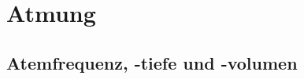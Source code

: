 % 
% 





\clearpage
\section{Atmung}

\subsection{Atemfrequenz, -tiefe und -volumen}
\label{topic:atemvolumina}


